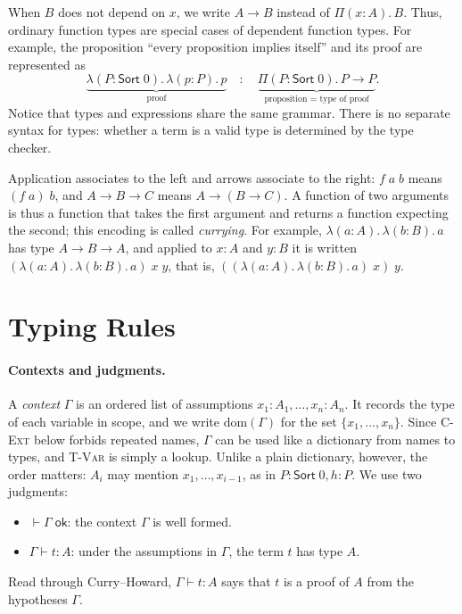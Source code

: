 \documentclass[acmsmall,screen,nonacm]{acmart}
\newcommand{\Sort}[1]{\mathsf{Sort}\;#1}
\newcommand{\tPi}[3]{\Pi(#1{:}#2).\,#3}
\newcommand{\tLam}[3]{\lambda(#1{:}#2).\,#3}
\newcommand{\dom}{\mathrm{dom}}
\newcommand{\ctxok}[1]{\vdash #1\;\mathsf{ok}}
\begin{document}
\noindent When $B$ does not depend on $x$, we write $A \to B$ instead of
$\tPi{x}{A}{B}$. Thus, ordinary function types are special cases
of dependent function types. For example, the proposition ``every proposition implies itself''
and its proof are represented as
\[
\underbrace{\tLam{P}{\Sort{0}}{\tLam{p}{P}{p}}}_{\text{proof}}
\quad : \quad
\underbrace{\tPi{P}{\Sort{0}}{P \to P}}_{\text{proposition = type of proof}}.
\]
Notice that types and expressions share the same grammar.
There is no separate syntax for types: whether a term is a valid
type is determined by the type checker.

Application associates to the left and arrows associate to the right: $f\;a\;b$ means $(f\;a)\;b$, and
$A \to B \to C$ means $A \to (B \to C)$. A function of two arguments is thus a function that takes the first
argument and returns a function expecting the second; this encoding is called \emph{currying}. For example,
$\tLam{a}{A}{\tLam{b}{B}{a}}$ has type $A \to B \to A$, and applied to $x : A$ and $y : B$ it is written
$(\tLam{a}{A}{\tLam{b}{B}{a}})\;x\;y$, that is, $((\tLam{a}{A}{\tLam{b}{B}{a}})\;x)\;y$.


\section{Typing Rules}
\label{sec:typing}

\paragraph{Contexts and judgments.}
A \emph{context} $\Gamma$ is an ordered list of assumptions $x_1 : A_1, \ldots, x_n : A_n$.
It records the type of each variable in scope, and we write $\dom(\Gamma)$ for the set $\{x_1, \ldots, x_n\}$.
Since \textsc{C-Ext} below forbids repeated names, $\Gamma$ can be used like a dictionary from names to types,
and \textsc{T-Var} is simply a lookup.
Unlike a plain dictionary, however, the order matters: $A_i$ may mention $x_1, \ldots, x_{i-1}$, as in $P : \Sort{0}, h : P$.
We use two judgments:
\begin{itemize}
  \item $\ctxok{\Gamma}$: the context $\Gamma$ is well formed.
  \item $\Gamma \vdash t : A$: under the assumptions in $\Gamma$, the term $t$ has type $A$.
\end{itemize}
Read through Curry--Howard, $\Gamma \vdash t : A$ says that $t$ is a proof of $A$ from the hypotheses $\Gamma$.
\end{document}
